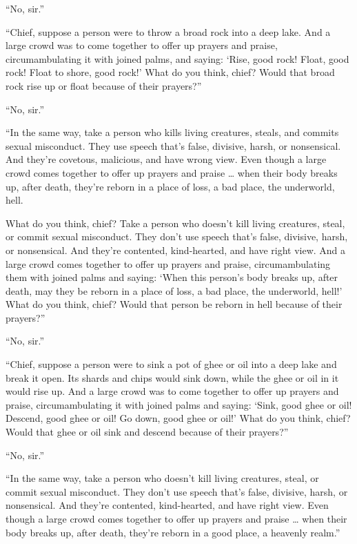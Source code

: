 \documentclass[12pt,openany]{book}%
\begin{document}
“No, sir.” 

“Chief, suppose a person were to throw a broad rock into a deep lake. And a large crowd was to come together to offer up prayers and praise, circumambulating it with joined palms, and saying: ‘Rise, good rock! Float, good rock! Float to shore, good rock!’ What do you think, chief? Would that broad rock rise up or float because of their prayers?” 

“No, sir.” 

“In the same way, take a person who kills living creatures, steals, and commits sexual misconduct. They use speech that’s false, divisive, harsh, or nonsensical. And they’re covetous, malicious, and have wrong view. Even though a large crowd comes together to offer up prayers and praise … when their body breaks up, after death, they’re reborn in a place of loss, a bad place, the underworld, hell. 

What do you think, chief? Take a person who doesn’t kill living creatures, steal, or commit sexual misconduct. They don’t use speech that’s false, divisive, harsh, or nonsensical. And they’re contented, kind-hearted, and have right view. And a large crowd comes together to offer up prayers and praise, circumambulating them with joined palms and saying: ‘When this person’s body breaks up, after death, may they be reborn in a place of loss, a bad place, the underworld, hell!’ What do you think, chief? Would that person be reborn in hell because of their prayers?” 

“No, sir.” 

“Chief, suppose a person were to sink a pot of ghee or oil into a deep lake and break it open. Its shards and chips would sink down, while the ghee or oil in it would rise up. And a large crowd was to come together to offer up prayers and praise, circumambulating it with joined palms and saying: ‘Sink, good ghee or oil! Descend, good ghee or oil! Go down, good ghee or oil!’ What do you think, chief? Would that ghee or oil sink and descend because of their prayers?” 

“No, sir.” 

“In the same way, take a person who doesn’t kill living creatures, steal, or commit sexual misconduct. They don’t use speech that’s false, divisive, harsh, or nonsensical. And they’re contented, kind-hearted, and have right view. Even though a large crowd comes together to offer up prayers and praise … when their body breaks up, after death, they’re reborn in a good place, a heavenly realm.” 
\end{document}
